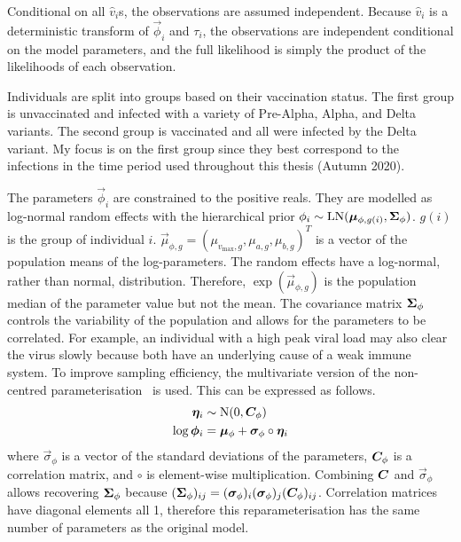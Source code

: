\documentclass[thesis.tex]{subfiles}
\begin{document}
Conditional on all $\hat{v}_i$s, the observations are assumed independent.
Because $\hat{v}_i$ is a deterministic transform of $\vec{\phi}_i$ and $\tau_i$, the observations are independent conditional on the model parameters, and the full likelihood is simply the product of the likelihoods of each observation.

Individuals are split into groups based on their vaccination status.
The first group is unvaccinated and infected with a variety of Pre-Alpha, Alpha, and Delta variants.
The second group is vaccinated and all were infected by the Delta variant.
My focus is on the first group since they best correspond to the infections in the time period used throughout this thesis (Autumn 2020).

The parameters $\vec{\phi}_i$ are constrained to the positive reals.
They are modelled as log-normal random effects with the hierarchical prior $\phi_i \sim \operatorname{LN}(\bm{\mu}_{\phi,g(i)}, \bm{\Sigma}_\phi)$.
$g(i)$ is the group of individual $i$.
$\vec{\mu}_{\phi,g} = (\mu_{v_{\max},g}, \mu_{a,g}, \mu_{b,g})^T$ is a vector of the population means of the log-parameters.
The random effects have a log-normal, rather than normal, distribution.
Therefore, $\exp(\vec{\mu}_{\phi,g})$ is the population median of the parameter value but not the mean.
The covariance matrix $\bm{\Sigma}_\phi$ controls the variability of the population and allows for the parameters to be correlated.
For example, an individual with a high peak viral load may also clear the virus slowly because both have an underlying cause of a weak immune system.
To improve sampling efficiency, the multivariate version of the non-centred parameterisation~\autocites{papaspiliopoulosGeneral,stanReparameterization} is used.
This can be expressed as follows.
\begin{align}
  \bm{\eta}_i &\sim \operatorname{N}(0, \bm{C}_\phi) \\
  \log \bm{\phi}_i &= \bm{\mu}_\phi + \bm{\sigma}_\phi \circ \bm{\eta}_i
\end{align}
where $\vec{\sigma}_\phi$ is a vector of the standard deviations of the parameters, $\bm{C}_\phi$ is a correlation matrix, and $\circ$ is element-wise multiplication.
Combining $\bm{C}$ and $\vec{\sigma}_\phi$ allows recovering $\bm\Sigma_\phi$ because $(\bm{\Sigma}_\phi)_{ij} = (\bm{\sigma}_\phi)_i (\bm{\sigma}_\phi)_j (\bm{C}_\phi)_{ij}$.
Correlation matrices have diagonal elements all 1, therefore this reparameterisation has the same number of parameters as the original model.
\end{document}
